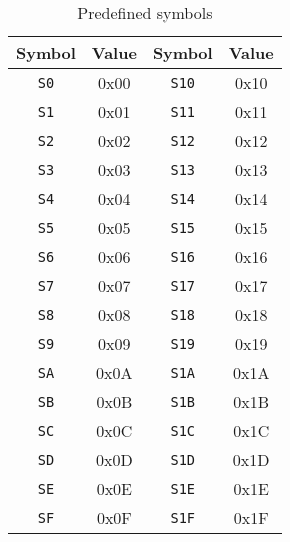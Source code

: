             \begin{table}[h!]
                \centering
                \begin{tabular}{|cc|cc|}
                    \hline
                    \textbf{Symbol} & \textbf{Value} & \textbf{Symbol} & \textbf{Value} \\\hline
                    \texttt{S0}     & 0x00           & \texttt{S10}    & 0x10           \\\hline
                    \texttt{S1}     & 0x01           & \texttt{S11}    & 0x11           \\\hline
                    \texttt{S2}     & 0x02           & \texttt{S12}    & 0x12           \\\hline
                    \texttt{S3}     & 0x03           & \texttt{S13}    & 0x13           \\\hline
                    \texttt{S4}     & 0x04           & \texttt{S14}    & 0x14           \\\hline
                    \texttt{S5}     & 0x05           & \texttt{S15}    & 0x15           \\\hline
                    \texttt{S6}     & 0x06           & \texttt{S16}    & 0x16           \\\hline
                    \texttt{S7}     & 0x07           & \texttt{S17}    & 0x17           \\\hline
                    \texttt{S8}     & 0x08           & \texttt{S18}    & 0x18           \\\hline
                    \texttt{S9}     & 0x09           & \texttt{S19}    & 0x19           \\\hline
                    \texttt{SA}     & 0x0A           & \texttt{S1A}    & 0x1A           \\\hline
                    \texttt{SB}     & 0x0B           & \texttt{S1B}    & 0x1B           \\\hline
                    \texttt{SC}     & 0x0C           & \texttt{S1C}    & 0x1C           \\\hline
                    \texttt{SD}     & 0x0D           & \texttt{S1D}    & 0x1D           \\\hline
                    \texttt{SE}     & 0x0E           & \texttt{S1E}    & 0x1E           \\\hline
                    \texttt{SF}     & 0x0F           & \texttt{S1F}    & 0x1F           \\\hline
                \end{tabular}
                \caption{Predefined symbols}
            \end{table}

